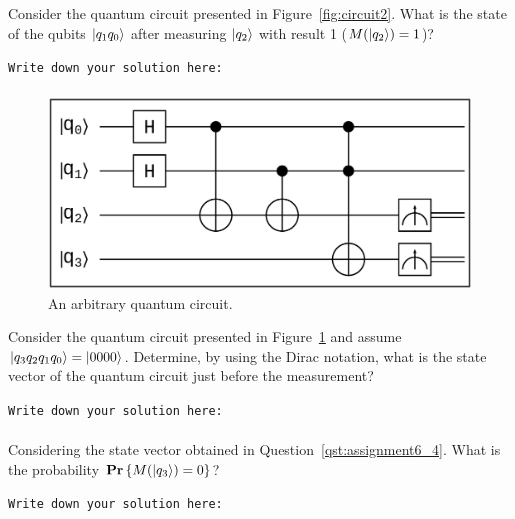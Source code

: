 \begin{question}
Consider the quantum circuit presented in Figure~\ref{fig:circuit2}. What is the state of the qubits $\ket{q_{1}q_{0}}$ after measuring $\ket{q_{2}}$ with result 1 ($M(\ket{q_{2}}) = 1$)?
\label{qst:assignment6_3}
\end{question}
{\small
\texttt{Write down your solution here:}
\begin{equation*}
  \begin{split}
  \end{split}
\end{equation*}}
\vspace{0.1cm}

\begin{figure}[t]
  \centerline{\includegraphics[scale=0.25]{img/qci_a6_question4.ps}}
  \caption{An arbitrary quantum circuit.}
  \label{fig:circuit3}
\end{figure}

\begin{question}
Consider the quantum circuit presented in Figure~\ref{fig:circuit3} and assume $\ket{q_{3}q_{2}q_{1}q_{0}} = \ket{0000}$. Determine, by using the Dirac notation, what is the state vector of the quantum circuit just before the measurement?
\label{qst:assignment6_4}
\end{question}
{\small
\texttt{Write down your solution here:}
\begin{equation*}
  \begin{split}
  \end{split}
\end{equation*}}
\vspace{0.1cm}

\begin{question}
Considering the state vector obtained in Question~\ref{qst:assignment6_4}. What is the probability  $\mathbf{Pr}\left\{ M(\ket{q_{3}}) = 0 \right\}$?
\label{qst:assignment6_5}
\end{question}
{\small
\texttt{Write down your solution here:}
\begin{equation*}
  \begin{split}
  \end{split}
\end{equation*}}
\vspace{0.1cm}

